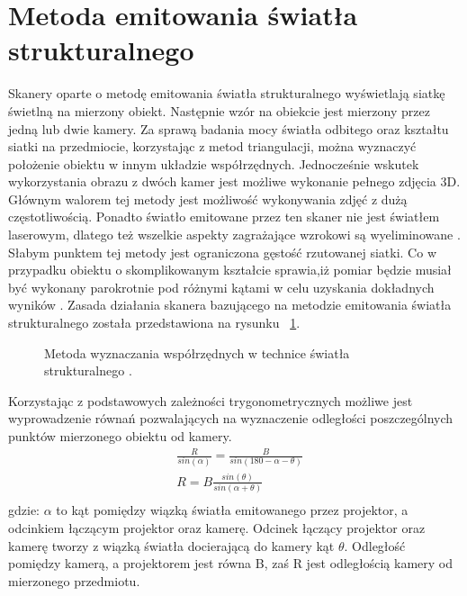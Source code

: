\section{Metoda emitowania światła strukturalnego}
Skanery oparte o metodę emitowania światła strukturalnego wyświetlają siatkę świetlną na mierzony obiekt. Następnie wzór na obiekcie jest mierzony przez jedną lub dwie kamery. Za sprawą badania mocy światła odbitego oraz kształtu siatki na przedmiocie, korzystając z metod triangulacji, można wyznaczyć położenie obiektu w innym układzie współrzędnych. Jednocześnie wskutek wykorzystania obrazu z dwóch kamer jest możliwe wykonanie pełnego zdjęcia 3D. Głównym walorem tej metody jest możliwość wykonywania zdjęć z dużą częstotliwością. Ponadto światło emitowane przez ten skaner nie jest światłem laserowym, dlatego też wszelkie aspekty zagrażające wzrokowi są wyeliminowane \cite{nowacki2018pomiar}. Słabym punktem tej metody jest ograniczona gęstość rzutowanej siatki. Co w przypadku obiektu o skomplikowanym kształcie sprawia,iż pomiar będzie musiał być wykonany parokrotnie pod różnymi kątami w celu uzyskania dokładnych wyników \cite{nowacki2018pomiar}. Zasada działania skanera bazującego na metodzie emitowania światła strukturalnego została przedstawiona na rysunku ~\ref{fig:structureLightPic1}.

\begin{figure}[H]
  \centering
   
  \caption{Metoda wyznaczania współrzędnych w technice światła strukturalnego \cite{Wrona_Piotrowska_2015}.}   
  \label{fig:structureLightPic1}
\end{figure}
\newline
Korzystając z podstawowych zależności trygonometrycznych możliwe jest wyprowadzenie równań pozwalających na wyznaczenie odległości poszczególnych punktów mierzonego obiektu od kamery.
\begin{equation} 
    \begin{aligned}
        & \frac{R}{sin(\alpha)}=\frac{B}{sin(180-\alpha-\theta)} \\
          & R=B\frac{sin(\theta)}{sin(\alpha+\theta)} \\
    \end{aligned}
\end{equation}
gdzie: $\alpha$ to kąt pomiędzy wiązką światła emitowanego przez projektor, a odcinkiem łączącym projektor oraz kamerę. Odcinek łączący projektor oraz kamerę tworzy z wiązką światła docierającą do kamery kąt $\theta$. Odległość pomiędzy kamerą, a projektorem jest równa B, zaś R jest odległością kamery od mierzonego przedmiotu.

